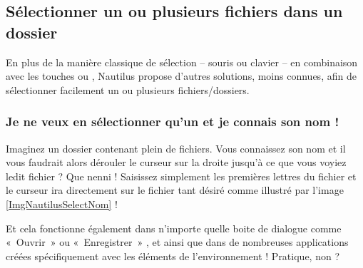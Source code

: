 \subsection{Sélectionner un ou plusieurs fichiers dans un dossier}
En plus de la manière classique de sélection -- souris ou clavier -- en combinaison avec les touches  ou , Nautilus propose d'autres solutions, moins connues, afin de sélectionner facilement un ou plusieurs fichiers/dossiers.
\subsubsection{Je ne veux en sélectionner qu'un et je connais son nom !}
Imaginez un dossier contenant plein de fichiers. Vous connaissez son nom et il vous faudrait alors dérouler le curseur sur la droite jusqu'à ce que vous voyiez ledit fichier ? Que nenni ! Saisissez simplement les premières lettres du fichier et le curseur ira directement sur le fichier tant désiré comme illustré par l'image \ref{ImgNautilusSelectNom} !
\begin{nota}
Et cela fonctionne également dans n'importe quelle boite de dialogue comme «~Ouvrir~» ou «~Enregistrer~» , et ainsi que dans de nombreuses applications créées spécifiquement avec les éléments de l'environnement  ! Pratique, non ?
\end{nota}
